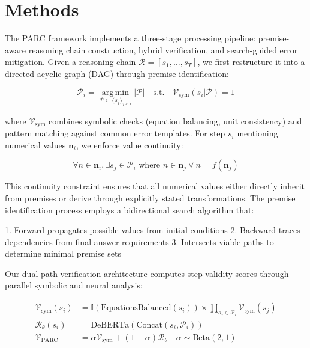 \documentclass{article}
\begin{document}
\section*{Methods}
The PARC framework implements a three-stage processing pipeline: premise-aware reasoning chain construction, hybrid verification, and search-guided error mitigation. Given a reasoning chain $\mathcal{R} = [s_1, ..., s_T]$, we first restructure it into a directed acyclic graph (DAG) through premise identification:

\begin{equation}
\mathcal{P}_i = \operatorname*{arg\,min}_{\mathcal{P} \subseteq \{s_j\}_{j<i}} \left|\mathcal{P}\right| \quad \text{s.t.} \quad \mathcal{V}_{\text{sym}}(s_i|\mathcal{P}) = 1
\end{equation}

where $\mathcal{V}_{\text{sym}}$ combines symbolic checks (equation balancing, unit consistency) and pattern matching against common error templates. For step $s_i$ mentioning numerical values $\mathbf{n}_i$, we enforce value continuity:

\begin{equation}
\forall n \in \mathbf{n}_i, \exists s_j \in \mathcal{P}_i \text{ where } n \in \mathbf{n}_j \lor n = f(\mathbf{n}_j)
\end{equation}

This continuity constraint ensures that all numerical values either directly inherit from premises or derive through explicitly stated transformations. The premise identification process employs a bidirectional search algorithm that:

1. Forward propagates possible values from initial conditions
2. Backward traces dependencies from final answer requirements
3. Intersects viable paths to determine minimal premise sets

Our dual-path verification architecture computes step validity scores through parallel symbolic and neural analysis:

\begin{align}
\mathcal{V}_{\text{sym}}(s_i) &= \mathbb{I}(\text{EquationsBalanced}(s_i)) \times \prod_{s_j \in \mathcal{P}_i} \mathcal{V}_{\text{sym}}(s_j) \\
\mathcal{R}_\theta(s_i) &= \text{DeBERTa}(\text{Concat}(s_i, \mathcal{P}_i)) \\
\mathcal{V}_{\text{PARC}} &= \alpha \mathcal{V}_{\text{sym}} + (1-\alpha)\mathcal{R}_\theta \quad \alpha \sim \text{Beta}(2,1)
\end{align}
\end{document}
